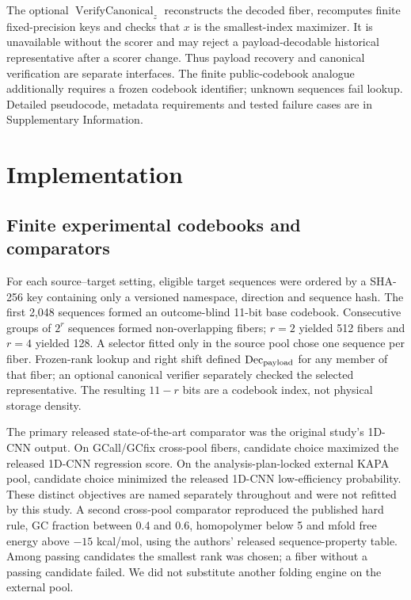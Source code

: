 \documentclass[10pt]{article}
\begin{document}
The optional $\operatorname{VerifyCanonical}_z$ reconstructs the decoded fiber, recomputes finite fixed-precision keys and checks that $x$ is the smallest-index maximizer. It is unavailable without the scorer and may reject a payload-decodable historical representative after a scorer change. Thus payload recovery and canonical verification are separate interfaces. The finite public-codebook analogue additionally requires a frozen codebook identifier; unknown sequences fail lookup. Detailed pseudocode, metadata requirements and tested failure cases are in Supplementary Information.

\section{Implementation}

\subsection{Finite experimental codebooks and comparators}

For each source--target setting, eligible target sequences were ordered by a SHA-256 key containing only a versioned namespace, direction and sequence hash. The first 2,048 sequences formed an outcome-blind 11-bit base codebook. Consecutive groups of $2^r$ sequences formed non-overlapping fibers; $r=2$ yielded 512 fibers and $r=4$ yielded 128. A selector fitted only in the source pool chose one sequence per fiber. Frozen-rank lookup and right shift defined $\operatorname{Dec}_{\rm payload}$ for any member of that fiber; an optional canonical verifier separately checked the selected representative. The resulting $11-r$ bits are a codebook index, not physical storage density.

The primary released state-of-the-art comparator was the original study's 1D-CNN output. On GCall/GCfix cross-pool fibers, candidate choice maximized the released 1D-CNN regression score. On the analysis-plan-locked external KAPA pool, candidate choice minimized the released 1D-CNN low-efficiency probability. These distinct objectives are named separately throughout and were not refitted by this study. A second cross-pool comparator reproduced the published hard rule, GC fraction between 0.4 and 0.6, homopolymer below 5 and mfold free energy above $-15$ kcal/mol, using the authors' released sequence-property table. Among passing candidates the smallest rank was chosen; a fiber without a passing candidate failed. We did not substitute another folding engine on the external pool.
\end{document}
